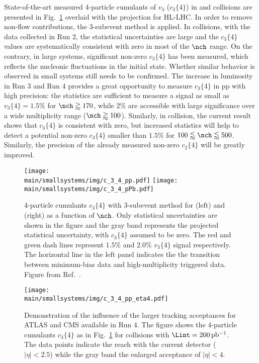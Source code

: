 \documentclass[../report.tex]{subfiles}
\providecommand{\main}{..}
\begin{document}
State-of-the-art measured 4-particle cumulants of $v_3$ ($c_3\{4\}$) in \pp and \pPb collisions are presented in Fig.~\ref{fig:smallsystems_corr_cumulants} overlaid with the projection for HL-LHC.
In order to remove non-flow contributions, the 3-subevent method is applied. In \pp collisions, with the data collected in Run 2, the statistical uncertainties are large and the $c_3\{4\}$ values are systematically consistent with zero in most of the $\nch$ range. On the contrary, in large systems, significant non-zero $c_3\{4\}$ has been measured, which reflects the nucleonic fluctuations in the initial state. Whether similar behavior is observed in small systems still needs to be confirmed. The increase in luminosity in Run 3 and Run 4 provides a great opportunity to measure $c_3\{4\}$ in pp with high precision: the statistics are sufficient to measure a signal as small as $v_3\{4\} = 1.5\%$ for $\nch \gtrapprox 170$, while 2\% are accessible with large significance over a wide multiplicity range ($\nch \gtrapprox 100$). Similarly, in \pPb collision, the current result shows that $c_3\{4\}$ is consistent with zero, but increased statistics will help to detect a potential non-zero $c_3\{4\}$ smaller than $1.5\%$ for $100 \lessapprox \nch \lessapprox 500$. Similarly, the precision of the already measured non-zero $c_2\{4\}$ will be greatly improved.

\begin{figure}[ht]
\centering
\texttt{[image: \\main/smallsystems/img/c\_3\_4\_pp.pdf]}
\hfill
\texttt{[image: \\main/smallsystems/img/c\_3\_4\_pPb.pdf]}
\caption{4-particle cumulants $c_3\{4\}$ with 3-subevent method for \pp (left) and \pPb (right) as a function of $\nch$. Only statistical uncertainties are shown in the figure and the gray band represents the projected statistical uncertainty, with $c_3\{4\}$ assumed to be zero. The red and green dash lines represent $1.5\%$ and $2.0\%$ $v_3\{4\}$ signal respectively. The horizontal line in the left panel indicates the the transition between minimum-bias data and high-multiplicity triggered data. Figure from Ref.~\cite{}.}
\label{fig:smallsystems_corr_cumulants}
\end{figure}

\begin{figure}[ht]
\centering
\texttt{[image: \\main/smallsystems/img/c\_3\_4\_pp\_eta4.pdf]}
\caption{Demonstration of the influence of the larger tracking acceptances for ATLAS and CMS available in Run 4. The figure shows the 4-particle cumulants $c_3\{4\}$ as in Fig.~\ref{fig:smallsystems_corr_cumulants} for \pp collisions with $\Lint = \unit[200]{pb^{-1}}$. The data points indicate the reach with the current detector ($|\eta| < 2.5$) while the gray band the enlarged acceptance of $|\eta| < 4$.}
\label{fig:smallsystems_corr_cumulants_eta4}
\end{figure}
\end{document}
